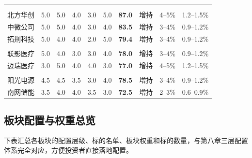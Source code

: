 \begin{exhibitbox}[表8B-19：核心+卫星组合标的五维评分与配置总览]
\begin{tabularx}{\linewidth}{X C{0.7cm} C{0.7cm} C{0.7cm} C{0.7cm} C{0.7cm} C{1.0cm} C{1.1cm} C{1.4cm} C{1.4cm}}
\midrule
{}
 \\
 \\
北方华创 & 5.0 & 5.0 & 4.0 & 3.0 & 5.0 & \textbf{87.0} & 增持 & 4--5\% & 1.2--1.5\% \\
中微公司 & 5.0 & 5.0 & 4.0 & 3.0 & 4.0 & \textbf{83.5} & 增持 & 3--4\% & 0.9--1.2\% \\
拓荆科技 & 5.0 & 4.0 & 4.0 & 2.0 & 5.0 & \textbf{79.4} & 增持 & 3--4\% & 0.9--1.2\% \\
\hline
{}
 \\
联影医疗 & 5.0 & 4.0 & 3.0 & 3.0 & 4.0 & \textbf{78.0} & 增持 & 3--4\% & 0.9--1.2\% \\
迈瑞医疗 & 3.0 & 5.0 & 4.0 & 4.0 & 3.0 & \textbf{77.0} & 增持 & 4--5\% & 1.2--1.5\% \\
\hline
{}
 \\
阳光电源 & 4.5 & 4.5 & 3.5 & 3.0 & 4.0 & \textbf{78.5} & 增持 & 3--4\% & 0.9--1.2\% \\
南网储能 & 3.5 & 4.0 & 4.0 & 3.5 & 3.0 & \textbf{72.5} & 增持 & 2--3\% & 0.6--0.9\% \\
\bottomrule
\end{tabularx}
\vspace{0.3em}
\end{exhibitbox}

\subsection{板块配置与权重总览}

下表汇总各板块的配置层级、标的名单、板块权重和标的数量，与第八章三层配置体系完全对应，方便投资者直接落地配置。

